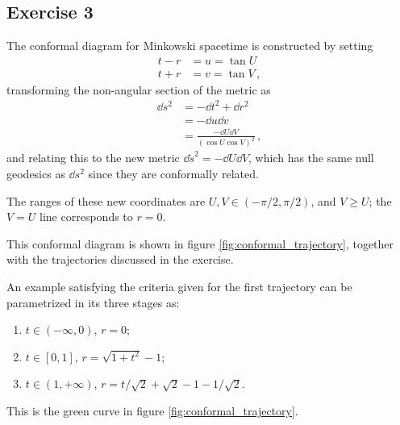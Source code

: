 \documentclass[main.tex]{subfiles}
\begin{document}
\subsection{Exercise 3}

The conformal diagram for Minkowski spacetime is constructed by setting 
%
\begin{align}
t - r &= u = \tan U  \\
t + r &= v = \tan V
\,,
\end{align}
%
transforming the non-angular section of the metric as 
%
\begin{align}
\dd{s^2} &= - \dd{t^2} + \dd{r^2}  \\
&= - \dd{u} \dd{v}  \\
&= \frac{- \dd{U} \dd{V}}{(\cos U \cos V)^2}
\,,
\end{align}
%
and relating this to the new metric \(\dd{\widetilde{s}}^2 = - \dd{U} \dd{V}\), which has the same null geodesics as \(\dd{s}^2\) since they are conformally related. 

The ranges of these new coordinates are \(U, V \in (- \pi /2, \pi /2)\), 
and \(V \geq U\); the \(V = U\) line corresponds to \(r = 0\). 

This conformal diagram is shown in figure 
\ref{fig:conformal_trajectory}, together with the trajectories discussed in the exercise. 

An example satisfying the criteria given for the first trajectory can be parametrized in its three stages as: 
\begin{enumerate}
    \item \(t \in (- \infty , 0)\), \(r = 0\);
    \item \(t \in [0, 1]\), \(r = \sqrt{1 + t^2} - 1\);
    \item \(t \in (1, + \infty )\), \(r = t / \sqrt{2} + \sqrt{2} - 1 - 1 / \sqrt{2}\).
\end{enumerate}

This is the green curve in figure \ref{fig:conformal_trajectory}.
\end{document}
